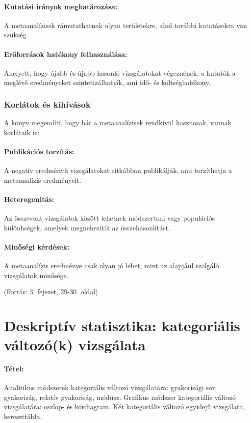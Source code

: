 \documentclass[a4paper,12pt]{article}
\begin{document}
    \paragraph{Kutatási irányok meghatározása:}
    A metaanalízisek rámutathatnak olyan területekre, ahol további kutatásokra van szükség.

    \paragraph{Erőforrások hatékony felhasználása:}
    Ahelyett, hogy újabb és újabb hasonló vizsgálatokat végeznének, a kutatók a meglévő eredményeket szintetizálhatják, ami idő- és költséghatékony.

    \subsubsection{Korlátok és kihívások}
    A könyv megemlíti, hogy bár a metaanalízisek rendkívül hasznosak, vannak korlátaik is:

    \paragraph{Publikációs torzítás:}
    A negatív eredményű vizsgálatokat ritkábban publikálják, ami torzíthatja a metaanalízis eredményeit.

    \paragraph{Heterogenitás:}
    Az összevont vizsgálatok között lehetnek módszertani vagy populációs különbségek, amelyek megnehezítik az összehasonlítást.

    \paragraph{Minőségi kérdések:}
    A metaanalízis eredménye csak olyan jó lehet, mint az alapjául szolgáló vizsgálatok minősége.

    (Forrás: 3. fejezet, 29-30. oldal)

    \newpage


    \section{Deskriptív statisztika: kategoriális változó(k) vizsgálata}

    \paragraph{Tétel:} Analitikus módszerek kategoriális változó vizsgálatára: gyakorisági sor, gyakoriság, relatív
    gyakoriság, módusz. Grafikus módszer kategoriális változó vizsgálatára: oszlop- és
    kördiagram. Két kategoriális változó egyidejű vizsgálata, kereszttábla.
\end{document}
